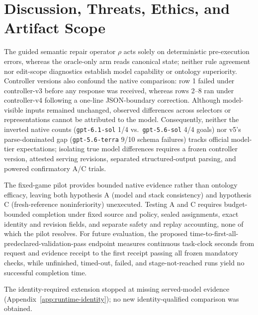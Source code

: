 \documentclass[journal]{IEEEtran}
\begin{document}
\section{Discussion, Threats, Ethics, and Artifact Scope}
The guided semantic repair operator $\rho$ \cite{S45_madaan2023selfrefine,S48_shinn2023reflexion,S46_chen2023selfdebug,S47_solarlezama2006sketching} acts solely on deterministic pre-execution errors, whereas the oracle-only arm reads canonical state; neither rule agreement nor edit-scope diagnostics establish model capability or ontology superiority.
Controller versions also confound the native comparison: row 1 failed under controller-v3 before any response was received, whereas rows 2--8 ran under controller-v4 following a one-line JSON-boundary correction. Although model-visible inputs remained unchanged, observed differences across selectors or representations cannot be attributed to the model.
Consequently, neither the inverted native counts (\texttt{gpt-6.1-sol} 1/4 vs.\ \texttt{gpt-5.6-sol} 4/4 goals) nor v5's parse-dominated gap (\texttt{gpt-5.6-terra} 9/10 schema failures) tracks official model-tier expectations; isolating true model differences requires a frozen controller version, attested serving revisions, separated structured-output parsing, and powered confirmatory A/C trials.


The fixed-game pilot provides bounded native evidence rather than ontology efficacy, leaving both hypothesis A (model and stack consistency) and hypothesis C (fresh-reference noninferiority) unexecuted. Testing A and C requires budget-bounded completion under fixed source and policy, sealed assignments, exact identity and revision fields, and separate safety and replay accounting, none of which the pilot resolves. For future evaluation, the proposed time-to-first-all-predeclared-validation-pass endpoint measures continuous task-clock seconds from request and evidence receipt to the first receipt passing all frozen mandatory checks, while unfinished, timed-out, failed, and stage-not-reached runs yield no successful completion time.

The identity-required extension stopped at missing served-model evidence (Appendix~\ref{app:runtime-identity}); no new identity-qualified comparison was obtained.
\end{document}
